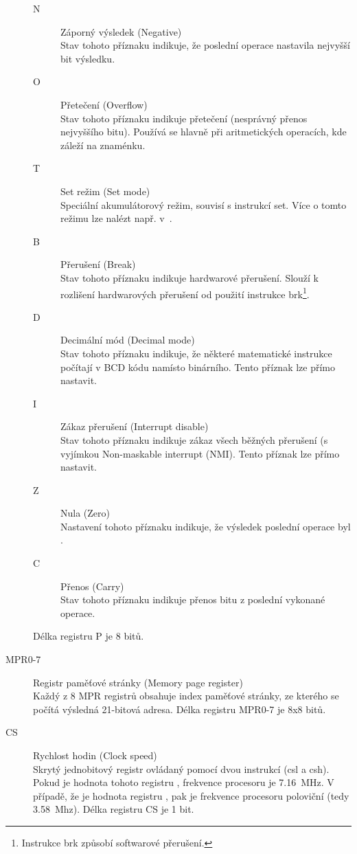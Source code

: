 \begin{description}
	\begin{description}
	\item[N] Záporný výsledek (Negative) \\
		Stav  tohoto příznaku indikuje,
		že poslední operace nastavila nejvyšší bit výsledku.

	\item[O] Přetečení (Overflow) \\
		Stav  tohoto příznaku indikuje přetečení (nesprávný přenos
		nejvyššího bitu). Používá se hlavně při aritmetických operacích, kde
		záleží na znaménku.

	\item[T] Set režim (Set mode) \\
		Speciální akumulátorový režim, souvisí s instrukcí {\sc set}. Více o
		tomto režimu lze nalézt např. v~\cite{MacDonald02}.

	\item[B] Přerušení (Break) \\
		Stav  tohoto příznaku indikuje hardwarové přerušení. Slouží k
		rozlišení hardwarových přerušení od použití instrukce {\sc
		brk}\footnote{Instrukce {\sc brk} způsobí softwarové přerušení.}.

	\item[D] Decimální mód (Decimal mode) \\
		Stav  tohoto příznaku indikuje, že některé matematické instrukce
		počítají v BCD kódu namísto binárního. Tento příznak lze přímo
		nastavit.

	\item[I] Zákaz přerušení (Interrupt disable) \\
		Stav  tohoto příznaku indikuje zákaz všech běžných přerušení (s
		vyjímkou Non-maskable interrupt (NMI). Tento příznak lze přímo
		nastavit.

	\item[Z] Nula (Zero) \\
		Nastavení tohoto příznaku indikuje, že výsledek poslední operace byl
		.

	\item[C] Přenos (Carry) \\
		Stav  tohoto příznaku indikuje přenos bitu z poslední vykonané
		operace.
	\end{description}

	Délka registru {\sf P} je 8 bitů.

\item[{\sf MPR0-7}] Registr paměťové stránky (Memory page register) \\
	Každý z 8 {\sf MPR} registrů obsahuje index paměťové stránky, ze kterého se
	počítá výsledná 21-bitová adresa. Délka registru {\sf MPR0-7} je 8x8 bitů.

\item[{\sf CS}] Rychlost hodin (Clock speed) \\
	Skrytý jednobitový registr ovládaný pomocí dvou instrukcí ({\sc csl} a {\sc
	csh}). Pokud je hodnota tohoto registru , frekvence procesoru je
	7.16~MHz. V případě, že je hodnota registru , pak je frekvence
	procesoru poloviční (tedy 3.58~Mhz). Délka registru {\sf CS} je 1 bit.
	\cite{Ormston06}
\end{description}

